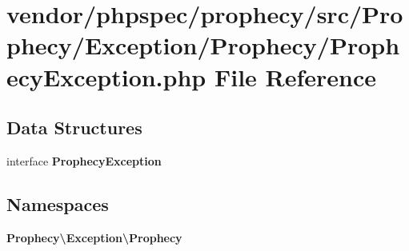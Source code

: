 \section{vendor/phpspec/prophecy/src/\+Prophecy/\+Exception/\+Prophecy/\+Prophecy\+Exception.php File Reference}
\label{_prophecy_exception_8php}
\subsection*{Data Structures}
\begin{DoxyCompactItemize}
\item 
interface {\bf Prophecy\+Exception}
\end{DoxyCompactItemize}
\subsection*{Namespaces}
\begin{DoxyCompactItemize}
\item 
 {\bf Prophecy\textbackslash{}\+Exception\textbackslash{}\+Prophecy}
\end{DoxyCompactItemize}
